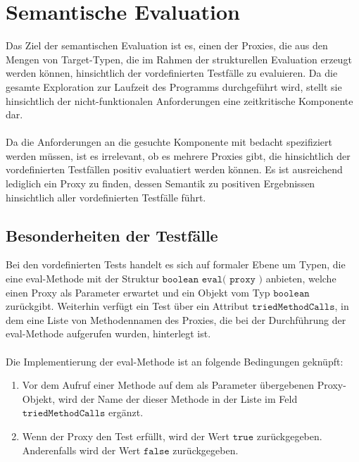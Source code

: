 \section{Semantische Evaluation}\label{sec_semEval}
Das Ziel der semantischen Evaluation ist es, einen der Proxies, die aus den Mengen von Target-Typen, die im Rahmen der strukturellen Evaluation erzeugt werden können, hinsichtlich der vordefinierten Testfälle zu evaluieren. Da die gesamte Exploration zur Laufzeit des Programms durchgeführt wird, stellt sie hinsichtlich der nicht-funktionalen Anforderungen eine zeitkritische Komponente dar.
\\\\
Da die Anforderungen an die gesuchte Komponente mit bedacht spezifiziert werden müssen, ist es irrelevant, ob es mehrere Proxies gibt, die hinsichtlich der vordefinierten Testfällen positiv evaluatiert werden können. Es ist ausreichend lediglich ein Proxy zu finden, dessen Semantik zu positiven Ergebnissen hinsichtlich aller vordefinierten Testfälle führt.
\subsection{Besonderheiten der Testfälle}\label{sec_testanforderungen}
Bei den vordefinierten Tests handelt es sich auf formaler Ebene um Typen, die eine eval-Methode mit der Struktur $\texttt{boolean eval( proxy )}$ anbieten, welche einen Proxy als Parameter erwartet und ein Objekt vom Typ $\texttt{boolean}$ zurückgibt. Weiterhin verfügt ein Test über ein Attribut $\texttt{triedMethodCalls}$, in dem eine Liste von Methodennamen des Proxies, die bei der Durchführung der eval-Methode aufgerufen wurden, hinterlegt ist.
\\\\
Die Implementierung der eval-Methode ist an folgende Bedingungen geknüpft:
\begin{enumerate}
\item Vor dem Aufruf einer Methode auf dem als Parameter übergebenen Proxy-Objekt, wird der Name der dieser Methode in der Liste im Feld $\texttt{triedMethodCalls}$ ergänzt.
\item Wenn der Proxy den Test erfüllt, wird der Wert $\texttt{true}$ zurückgegeben. Anderenfalls wird der Wert $\texttt{false}$ zurückgegeben.
\end{enumerate}

